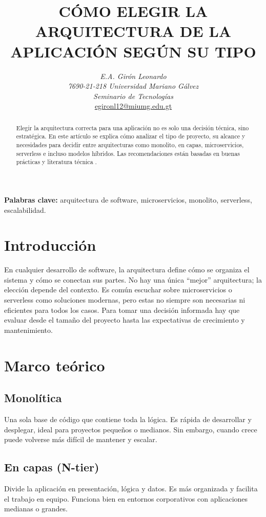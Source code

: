 \documentclass{article}
\title{\textbf{CÓMO ELEGIR LA ARQUITECTURA DE LA APLICACIÓN SEGÚN SU TIPO}}
\author{%
    \begin{tabular}{c}
        \textit{E.A. Girón Leonardo} \\
        \textit{7690-21-218 Universidad Mariano Gálvez} \\
        \textit{Seminario de Tecnologías} \\
        \href{mailto:egironl12@miumg.edu.gt}{\uline{egironl12@miumg.edu.gt}}
    \end{tabular}%
}
\date{}
\begin{document}
\maketitle

\begin{abstract}
Elegir la arquitectura correcta para una aplicación no es solo una decisión técnica, sino estratégica. En este artículo se explica cómo analizar el tipo de proyecto, su alcance y necesidades para decidir entre arquitecturas como monolito, en capas, microservicios, serverless e incluso modelos híbridos. Las recomendaciones están basadas en buenas prácticas y literatura técnica \parencite{bass2021, richards2020, villalobos2022}.
\end{abstract}

\textbf{Palabras clave:} arquitectura de software, microservicios, monolito, serverless, escalabilidad.

\section{Introducción}

En cualquier desarrollo de software, la arquitectura define cómo se organiza el sistema y cómo se conectan sus partes. No hay una única “mejor” arquitectura; la elección depende del contexto. Es común escuchar sobre microservicios o serverless como soluciones modernas, pero estas no siempre son necesarias ni eficientes para todos los casos. Para tomar una decisión informada hay que evaluar desde el tamaño del proyecto hasta las expectativas de crecimiento y mantenimiento.

\section{Marco teórico}

\subsection{Monolítica}
Una sola base de código que contiene toda la lógica. Es rápida de desarrollar y desplegar, ideal para proyectos pequeños o medianos. Sin embargo, cuando crece puede volverse más difícil de mantener y escalar.

\subsection{En capas (N-tier)}
Divide la aplicación en presentación, lógica y datos. Es más organizada y facilita el trabajo en equipo. Funciona bien en entornos corporativos con aplicaciones medianas o grandes.
\end{document}
